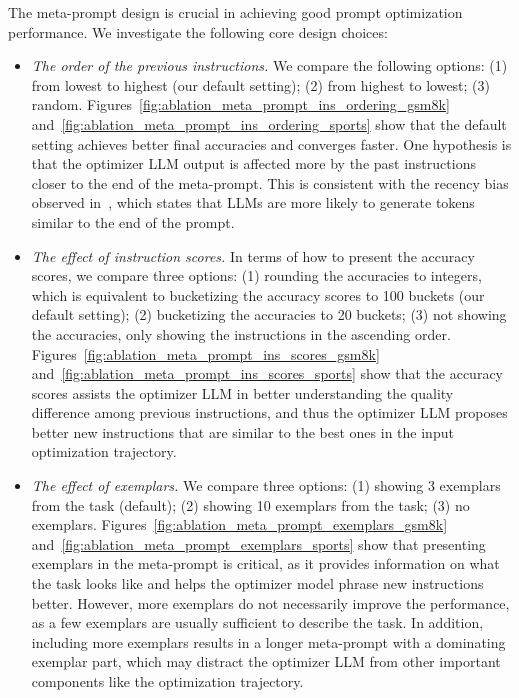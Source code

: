 The meta-prompt design is crucial in achieving good prompt optimization performance. We investigate the following core design choices:
\begin{itemize}[leftmargin=2em,topsep=0pt,partopsep=1ex,parsep=0ex]
\item \emph{The order of the previous instructions.}
We compare the following options: (1) from lowest to highest (our default setting); (2) from highest to lowest; (3) random.
Figures~\ref{fig:ablation_meta_prompt_ins_ordering_gsm8k} and~\ref{fig:ablation_meta_prompt_ins_ordering_sports} show that the default setting achieves better final accuracies and converges faster.
One hypothesis is that the optimizer LLM output is affected more by the past instructions closer to the end of the meta-prompt. 
This is consistent with the recency bias observed in~\citet{zhao2021calibrate}, which states that LLMs are more likely to generate tokens similar to the end of the prompt.

\item \emph{The effect of instruction scores.}
In terms of how to present the accuracy scores, we compare three options: (1) rounding the accuracies to integers, which is equivalent to bucketizing the accuracy scores to 100 buckets (our default setting); (2) bucketizing the accuracies to 20 buckets; (3) not showing the accuracies, only showing the instructions in the ascending order.
Figures~\ref{fig:ablation_meta_prompt_ins_scores_gsm8k} and~\ref{fig:ablation_meta_prompt_ins_scores_sports} show that the accuracy scores assists the optimizer LLM in better understanding the quality difference among previous instructions, and thus the optimizer LLM proposes better new instructions that are similar to the best ones in the input optimization trajectory.

\item \emph{The effect of exemplars.}
We compare three options: (1) showing 3 exemplars from the task (default); (2) showing 10 exemplars from the task; (3) no exemplars.
Figures~\ref{fig:ablation_meta_prompt_exemplars_gsm8k} and~\ref{fig:ablation_meta_prompt_exemplars_sports} show that presenting exemplars in the meta-prompt is critical, as it provides information on what the task looks like and helps the optimizer model phrase new instructions better.
However, more exemplars do not necessarily improve the performance, as a few exemplars are usually sufficient to describe the task. In addition, including more exemplars results in a longer meta-prompt with a dominating exemplar part, which may distract the optimizer LLM from other important components like the optimization trajectory.
\end{itemize}

